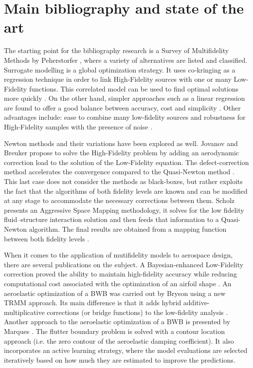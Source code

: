 \section{Main bibliography and state of the art}
\label{sec:unchapitre}
The starting point for the bibliography research is a Survey of Multifidelity Methods by Peherstorfer \cite{peherstorfer2018survey}, where a variety of alternatives are listed and classified. Surrogate modelling is a global optimization strategy. It uses co-kringing as a regression technique in order to link High-Fidelity sources with one or many Low-Fidelity functions. This
correlated model can be used to find optimal solutions more quickly \cite{Forrester2007}. On the other hand, simpler approaches such as a linear regression are found to offer a good balance between accuracy, cost and simplicity \cite{Zhang2019}. Other advantages include: ease to combine many low-fidelity sources and robustness for High-Fidelity samples with the presence of noise \cite{Zhang2019}. 

Newton methods and their variations have been explored as well. Jovanov and Breuker propose to solve the High-Fidelity problem by adding an aerodynamic correction load to the solution of the Low-Fidelity equation. The defect-correction method accelerates the convergence compared to the Quasi-Newton method \cite{Jovanov2015}. This last case does not consider the methods as black-boxes, but rather exploits the fact that the algorithms of both fidelity levels are known and can be modified at any stage to accommodate the necessary corrections between them. Scholz presents an Aggressive Space Mapping methodology, it solves for the low fidelity fluid–structure interaction solution and then feeds that information to a Quasi-Newton algorithm. The final results are obtained from a mapping function between both fidelity levels \cite{Scholcz2014}. 

When it comes to the application of mutifidelity models to aerospace design, there are several publications on the subject. A Bayesian-enhanced Low-Fidelity correction proved the ability to maintain high-fidelity accuracy while reducing
computational cost associated with the optimization of an airfoil shape \cite{fischer2018bayesian}. An aeroelastic optimization of a BWB was carried out by Bryson \cite{Bryson2019} using a new TRMM approach. Its main difference is that it adds hybrid additive-multiplicative corrections (or bridge functions) to the low-fidelity analysis \cite{Bryson2019a}. Another approach to the aeroelastic optimization of a BWB is presented by Marques \cite{Marques2019}. The flutter boundary problem is solved with a contour location approach (i.e. the zero contour of the aeroelastic damping coefficient). It also incorporates an active learning strategy, where the model evaluations are selected iteratively based on how much they are estimated to improve the predictions. 


